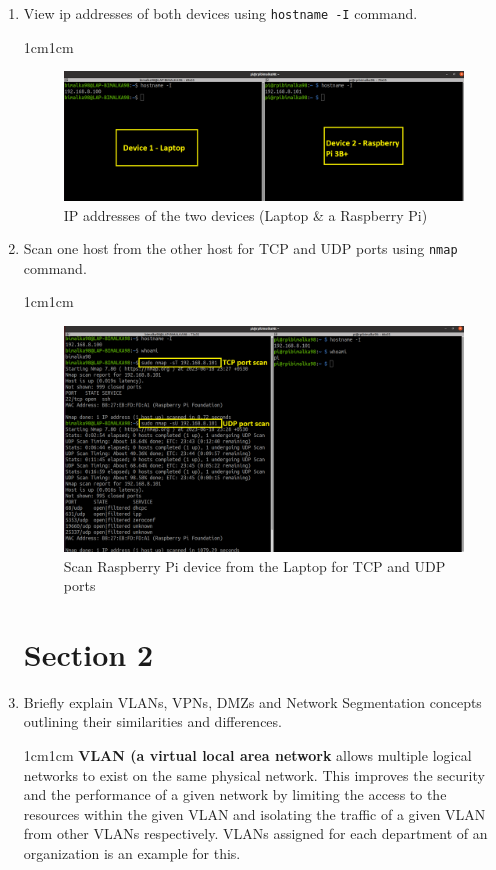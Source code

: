\documentclass[11pt,letterpaper]{article}
\newenvironment{answer}{\em \color{blue} \begin{adjustwidth}{1cm}{1cm}}{\end{adjustwidth}}
\begin{document}
\begin{enumerate}
		\item View ip addresses of both devices using \texttt{hostname -I} command.
		\begin{answer}
			\begin{figure}[H]
				\centering
				\includegraphics[width=0.9\columnwidth]{images/part3/2.png}
				\caption{IP addresses of the two devices (Laptop \& a Raspberry Pi)}
			\end{figure}
		\end{answer}
		\item Scan one host from the other host for TCP and UDP ports using \texttt{nmap} command.
		\begin{answer}
			\begin{figure}[H]
				\centering
				\includegraphics[width=0.9\columnwidth]{images/part3/4.png}
				\caption{Scan Raspberry Pi device from the Laptop for TCP and UDP ports}
			\end{figure}
		\end{answer}
		
		\section*{Section 2}
		
		
		\item Briefly explain VLANs, VPNs, DMZs and Network Segmentation concepts outlining their similarities and differences.
		
		\begin{answer}
			\textbf{VLAN (a virtual local area network} allows multiple logical networks to exist on the same physical network. This improves the security and the performance of a given network by limiting the access to the resources within the given VLAN and isolating the traffic of a given VLAN from other VLANs respectively. VLANs assigned for each department of an organization is an example for this.\\
			

\end{answer}
\end{enumerate}
\end{document}
